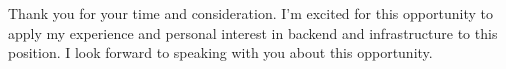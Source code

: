 \documentclass[11pt, letter]{awesome-cv}
\begin{document}
\begin{cvletter}



Thank you for your time and consideration.
I'm excited for this opportunity to apply my experience and 
personal interest in backend and infrastructure
to this position. I look forward to speaking with you about this opportunity.

\end{cvletter}


\makeletterclosing
\end{document}
